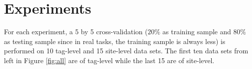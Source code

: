 \documentclass{sig-alternate-05-2015}
\begin{document}
\section{Experiments}
\label{sect:Experiment}



For each experiment, a 5 by 5 cross-validation ($20\%$ as training sample and $80\%$ as testing sample since in real tasks, the training sample is always less) is performed on 10 tag-level and 15 site-level data sets. The first ten data sets from left in Figure \ref{fig:all} are of tag-level while the last 15 are of site-level.



\begin{figure}[t!]
    \centering
    \quad
    \quad
    \quad
\end{figure}
\end{document}
